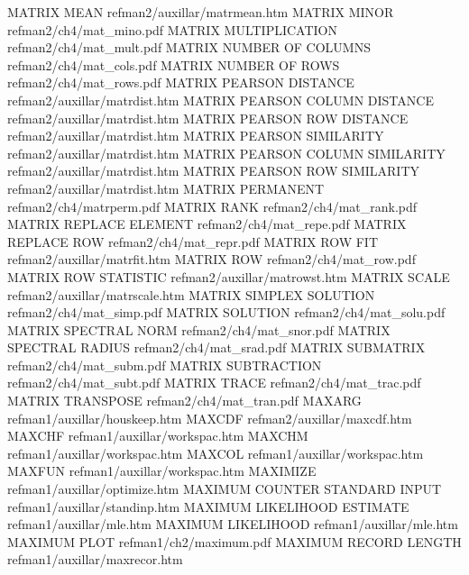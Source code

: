 MATRIX MEAN                             refman2/auxillar/matrmean.htm
MATRIX MINOR                            refman2/ch4/mat_mino.pdf
MATRIX MULTIPLICATION                   refman2/ch4/mat_mult.pdf
MATRIX NUMBER OF COLUMNS                refman2/ch4/mat_cols.pdf
MATRIX NUMBER OF ROWS                   refman2/ch4/mat_rows.pdf
MATRIX PEARSON DISTANCE                 refman2/auxillar/matrdist.htm
MATRIX PEARSON COLUMN DISTANCE          refman2/auxillar/matrdist.htm
MATRIX PEARSON ROW DISTANCE             refman2/auxillar/matrdist.htm
MATRIX PEARSON SIMILARITY               refman2/auxillar/matrdist.htm
MATRIX PEARSON COLUMN SIMILARITY        refman2/auxillar/matrdist.htm
MATRIX PEARSON ROW SIMILARITY           refman2/auxillar/matrdist.htm
MATRIX PERMANENT                        refman2/ch4/matrperm.pdf
MATRIX RANK                             refman2/ch4/mat_rank.pdf
MATRIX REPLACE ELEMENT                  refman2/ch4/mat_repe.pdf
MATRIX REPLACE ROW                      refman2/ch4/mat_repr.pdf
MATRIX ROW FIT                          refman2/auxillar/matrfit.htm
MATRIX ROW                              refman2/ch4/mat_row.pdf
MATRIX ROW STATISTIC                    refman2/auxillar/matrowst.htm
MATRIX SCALE                            refman2/auxillar/matrscale.htm
MATRIX SIMPLEX SOLUTION                 refman2/ch4/mat_simp.pdf
MATRIX SOLUTION                         refman2/ch4/mat_solu.pdf
MATRIX SPECTRAL NORM                    refman2/ch4/mat_snor.pdf
MATRIX SPECTRAL RADIUS                  refman2/ch4/mat_srad.pdf
MATRIX SUBMATRIX                        refman2/ch4/mat_subm.pdf
MATRIX SUBTRACTION                      refman2/ch4/mat_subt.pdf
MATRIX TRACE                            refman2/ch4/mat_trac.pdf
MATRIX TRANSPOSE                        refman2/ch4/mat_tran.pdf
MAXARG                                  refman1/auxillar/houskeep.htm
MAXCDF                                  refman2/auxillar/maxcdf.htm
MAXCHF                                  refman1/auxillar/workspac.htm
MAXCHM                                  refman1/auxillar/workspac.htm
MAXCOL                                  refman1/auxillar/workspac.htm
MAXFUN                                  refman1/auxillar/workspac.htm
MAXIMIZE                                refman1/auxillar/optimize.htm
MAXIMUM COUNTER STANDARD INPUT          refman1/auxillar/standinp.htm
MAXIMUM LIKELIHOOD ESTIMATE             refman1/auxillar/mle.htm
MAXIMUM LIKELIHOOD                      refman1/auxillar/mle.htm
MAXIMUM PLOT                            refman1/ch2/maximum.pdf
MAXIMUM RECORD LENGTH                   refman1/auxillar/maxrecor.htm

